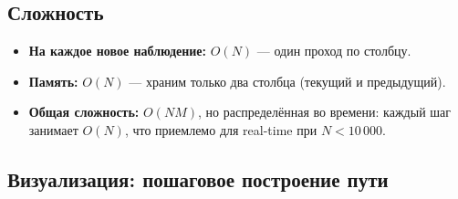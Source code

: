 \documentclass[a4paper,11pt]{article}
\begin{document}
\subsection{Сложность}

\begin{itemize}[leftmargin=2em]
  \item \textbf{На каждое новое наблюдение:} $O(N)$ --- один проход по столбцу.
  \item \textbf{Память:} $O(N)$ --- храним только два столбца (текущий и предыдущий).
  \item \textbf{Общая сложность:} $O(NM)$, но распределённая во времени:
        каждый шаг занимает $O(N)$, что приемлемо для real-time при $N < 10\,000$.
\end{itemize}

\subsection{Визуализация: пошаговое построение пути}
\end{document}
